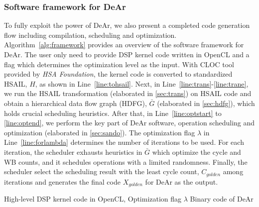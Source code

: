 \documentclass[12pt]{article}
\begin{document}
\begin{CJK}{UTF8}{bkai}
        \subsubsection{Software framework for DeAr}
            To fully exploit the power of DeAr, we also present a completed code generation flow including compilation, scheduling and optimization.
            Algorithm~\ref{alg:framework} provides an overview of the software framework for DeAr. 
            The user only need to provide DSP kernel code written in OpenCL and a flag which determines the optimization level as the input.
            With CLOC \cite{cloc} tool provided by \textit{HSA Foundation}, the kernel code is converted to standardized HSAIL, $H$, as shown in Line~\ref{line:tohsail}.
            Next, in Line~\ref{line:trans}-\ref{line:trane}, 
            we run the HSAIL transformation (elaborated in \ref{sec:trans}) on HSAIL code and obtain a hierarchical data flow graph (HDFG), 
            $\bar{G}$ (elaborated in \ref{sec:hdfg}), which holds crucial scheduling heuristics.
            After that, in Line~\ref{line:optstart} to \ref{line:optend}, we perform the key part of DeAr software, 
            operation scheduling and optimization (elaborated in \ref{sec:sando}).
            The optimization flag $\lambda$ in Line~\ref{line:forlambda} determines the number of iterations to be used.
            For each iteration, the scheduler exhausts heuristics in $\bar{G}$ which optimize the cycle and WB counts, 
            and it schedules operations with a limited randomness.
            Finally, the scheduler select the scheduling result with the least cycle count, 
            $C_{golden}$ among iterations and generates the final code $X_{golden}$ for DeAr as the output.
            \begin{algorithm}[h]
              \caption{}
              \begin{algorithmic}[1]
                    \Require 
                        High-level DSP kernel code in OpenCL, Optimization flag $\lambda$
                    \Ensure 
                        Binary code of DeAr


\end{algorithmic}
\end{algorithm}
\end{CJK}
\end{document}
